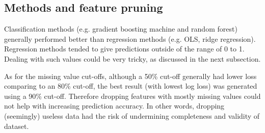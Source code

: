 \documentclass{article}\usepackage[]{graphicx}\usepackage[]{color}
\begin{document}
\subsection{Methods and feature pruning}
Classification methods (e.g. gradient boosting machine and random forest) generally performed better than regression methods (e.g. OLS, ridge regression). Regression methods tended to give predictions outside of the range of 0 to 1. Dealing with such values could be very tricky, as discussed in the next subsection.

As for the missing value cut-offs, although a 50\% cut-off generally had lower loss comparing to an 80\% cut-off, the best result (with lowest log loss) was generated using a 90\% cut-off. Therefore dropping features with mostly missing values could not help with increasing prediction accuracy. In other words, dropping (seemingly) useless data had the risk of undermining completeness and validity of dataset.
\end{document}
